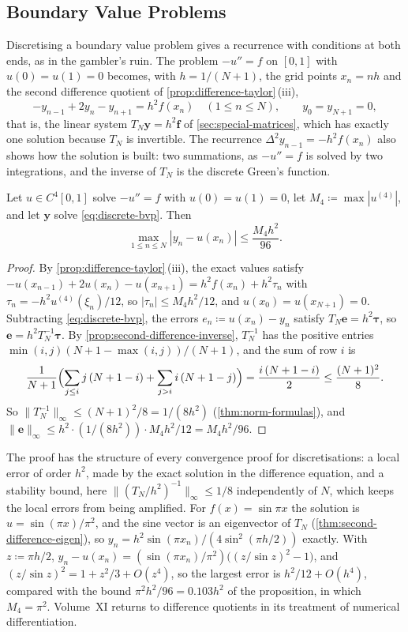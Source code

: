 \subsection{Boundary Value Problems}

Discretising a boundary value problem gives a recurrence with conditions at both ends, as in the gambler's ruin. The problem $-u''=f$ on $[0,1]$ with $u(0)=u(1)=0$ becomes, with $h=1/(N+1)$, the grid points $x_n=nh$ and the second difference quotient of \cref{prop:difference-taylor}\,(iii),
\begin{equation}
-y_{n-1}+2y_n-y_{n+1}=h^2f(x_n)\quad(1\le n\le N),\qquad y_0=y_{N+1}=0 ,
\label{eq:discrete-bvp}
\end{equation}
that is, the linear system $T_N\mathbf y=h^2\mathbf f$ of \cref{sec:special-matrices}, which has exactly one solution because $T_N$ is invertible. The recurrence $\Delta^2y_{n-1}=-h^2f(x_n)$ also shows how the solution is built: two summations, as $-u''=f$ is solved by two integrations, and the inverse of $T_N$ is the discrete Green's function.

\begin{proposition}
\label{prop:discrete-bvp}
Let $u\in C^4[0,1]$ solve $-u''=f$ with $u(0)=u(1)=0$, let $M_4\coloneqq\max|u^{(4)}|$, and let $\mathbf y$ solve \eqref{eq:discrete-bvp}. Then
\[
\max_{1\le n\le N}|y_n-u(x_n)|\le\frac{M_4h^2}{96} .
\]
\end{proposition}

\begin{proof}
By \cref{prop:difference-taylor}\,(iii), the exact values satisfy $-u(x_{n-1})+2u(x_n)-u(x_{n+1})=h^2f(x_n)+h^2\tau_n$ with $\tau_n=-h^2u^{(4)}(\xi_n)/12$, so $|\tau_n|\le M_4h^2/12$, and $u(x_0)=u(x_{N+1})=0$. Subtracting \eqref{eq:discrete-bvp}, the errors $e_n\coloneqq u(x_n)-y_n$ satisfy $T_N\mathbf e=h^2\boldsymbol\tau$, so $\mathbf e=h^2T_N^{-1}\boldsymbol\tau$. By \cref{prop:second-difference-inverse}, $T_N^{-1}$ has the positive entries $\min(i,j)(N+1-\max(i,j))/(N+1)$, and the sum of row $i$ is
\[
\frac{1}{N+1}\Bigl(\sum_{j\le i}j\,(N+1-i)+\sum_{j>i}i\,(N+1-j)\Bigr)=\frac{i\,(N+1-i)}2\le\frac{(N+1)^2}8 .
\]
So $\|T_N^{-1}\|_\infty\le(N+1)^2/8=1/(8h^2)$ (\cref{thm:norm-formulas}), and $\|\mathbf e\|_\infty\le h^2\cdot(1/(8h^2))\cdot M_4h^2/12=M_4h^2/96$.
\end{proof}

The proof has the structure of every convergence proof for discretisations: a local error of order $h^2$, made by the exact solution in the difference equation, and a stability bound, here $\|(T_N/h^2)^{-1}\|_\infty\le1/8$ independently of $N$, which keeps the local errors from being amplified. For $f(x)=\sin\pi x$ the solution is $u=\sin(\pi x)/\pi^2$, and the sine vector is an eigenvector of $T_N$ (\cref{thm:second-difference-eigen}), so $y_n=h^2\sin(\pi x_n)/(4\sin^2(\pi h/2))$ exactly. With $z\coloneqq\pi h/2$, $y_n-u(x_n)=(\sin(\pi x_n)/\pi^2)\bigl((z/\sin z)^2-1\bigr)$, and $(z/\sin z)^2=1+z^2/3+O(z^4)$, so the largest error is $h^2/12+O(h^4)$, compared with the bound $\pi^2h^2/96=0.103h^2$ of the proposition, in which $M_4=\pi^2$. Volume~XI returns to difference quotients in its treatment of numerical differentiation.

